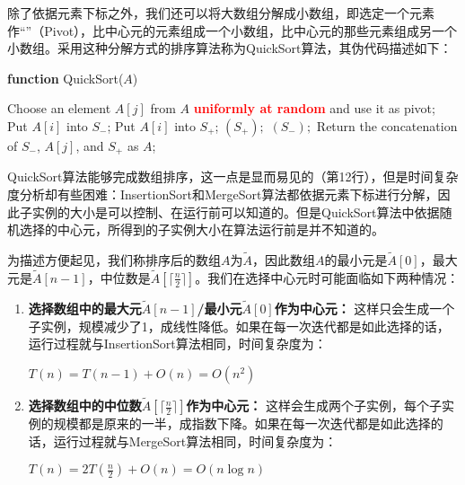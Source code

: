 除了依据元素下标之外，我们还可以将大数组分解成小数组，即选定一个元素作“”（Pivot），比中心元的元素组成一个小数组，比中心元的那些元素组成另一个小数组。采用这种分解方式的排序算法称为{\sc QuickSort}算法\cite{Hoare1961}，其伪代码描述如下：

\begin{algorithm}[H]
\caption{{\sc QuickSort} algorithm}\label{QuickSortAlgo} 
{\bf function} {\sc QuickSort}($A$) 
\begin{algorithmic}[1]
\STATE Choose an element $A[j]$ from $A$ \textcolor{red}{\bf uniformly at random} and use it as pivot;
		\STATE Put $A[i]$ into $S_{-}$;
	\ELSE 
		\STATE Put $A[i]$ into $S_{+}$; 
	\ENDIF
\ENDFOR
{}$(S_{+});$
$(S_{-});$
\STATE Return the concatenation of $S_{-}$, $A[j]$, and $S_{+}$ as $A$; 
\end{algorithmic}
\end{algorithm}


    {\sc QuickSort}算法能够完成数组排序，这一点是显而易见的（第12行），但是时间复杂度分析却有些困难：{\sc InsertionSort}和{\sc MergeSort}算法都依据元素下标进行分解，因此子实例的大小是可以控制、在运行前可以知道的。但是{\sc QuickSort}算法中依据随机选择的中心元，所得到的子实例大小在算法运行前是并不知道的。
    
    为描述方便起见，我们称排序后的数组$A$为$\tilde{A}$，因此数组$A$的最小元是$\tilde{A}[0]$，最大元是$\tilde{A}[n-1]$，中位数是$\tilde{A}[\lceil\frac{n}{2}\rceil]$。我们在选择中心元时可能面临如下两种情况：
    \begin{enumerate}[(1)]
 \item 
{\bf 选择数组中的最大元$\tilde{A}[n-1]$/最小元$\tilde{A}[0]$作为中心元：}  这样只会生成一个子实例，规模减少了1，成线性降低。如果在每一次迭代都是如此选择的话，运行过程就与{\sc InsertionSort}算法相同，时间复杂度为：
\begin{center}
$T(n) = T(n-1) + O(n) = O(n^2)$
\end{center}

\item {\bf 选择数组中的中位数$\tilde{A}[\lceil\frac{n}{2}\rceil]$作为中心元：}  这样会生成两个子实例，每个子实例的规模都是原来的一半，成指数下降。如果在每一次迭代都是如此选择的话，运行过程就与{\sc MergeSort}算法相同，时间复杂度为：
\begin{center}
$T(n) = 2T(\tfrac{n}{2}) + O(n) = O(n \log n)$
\end{center}
\end{enumerate}

